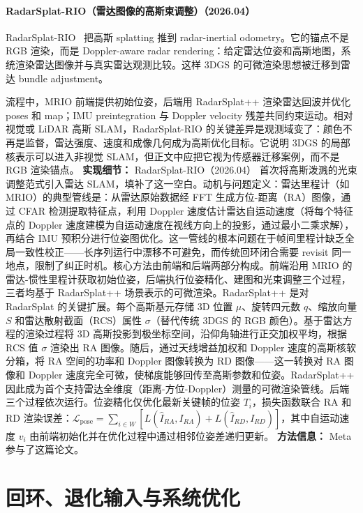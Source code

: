 \paragraph{RadarSplat-RIO（雷达图像的高斯束调整）（2026.04）}
RadarSplat-RIO~\cite{2604_13492} 把高斯 splatting 推到 radar-inertial odometry。它的锚点不是 RGB 渲染，而是 Doppler-aware radar rendering：给定雷达位姿和高斯地图，系统渲染雷达图像并与真实雷达观测比较。这样 3DGS 的可微渲染思想被迁移到雷达 bundle adjustment。

流程中，MRIO 前端提供初始位姿，后端用 RadarSplat++ 渲染雷达回波并优化 poses 和 map；IMU preintegration 与 Doppler velocity 残差共同约束运动。相对视觉或 LiDAR 高斯 SLAM，RadarSplat-RIO 的关键差异是观测域变了：颜色不再是监督，雷达强度、速度和成像几何成为高斯优化目标。它说明 3DGS 的局部核表示可以进入非视觉 SLAM，但正文中应把它视为传感器迁移案例，而不是 RGB 渲染锚点。
\textbf{实现细节：} RadarSplat-RIO（2026.04） 首次将高斯泼溅的光束调整范式引入雷达 SLAM，填补了这一空白。动机与问题定义：雷达里程计（如 MRIO）的典型管线是：从雷达原始数据经 FFT 生成方位-距离（RA）图像，通过 CFAR 检测提取特征点，利用 Doppler 速度估计雷达自运动速度（将每个特征点的 Doppler 速度建模为自运动速度在视线方向上的投影，通过最小二乘求解），再结合 IMU 预积分进行位姿图优化。这一管线的根本问题在于帧间里程计缺乏全局一致性校正——长序列运行中漂移不可避免，而传统回环闭合需要 revisit 同一地点，限制了纠正时机。核心方法由前端和后端两部分构成。前端沿用 MRIO 的雷达-惯性里程计获取初始位姿，后端执行位姿精化、建图和光束调整三个过程，三者均基于 RadarSplat++ 场景表示的可微渲染。RadarSplat++ 是对 RadarSplat 的关键扩展。每个高斯基元存储 3D 位置 $\mu$、旋转四元数 $q$、缩放向量 $S$ 和雷达散射截面（RCS）属性 $\sigma$（替代传统 3DGS 的 RGB 颜色）。基于雷达方程的渲染过程将 3D 高斯投影到极坐标空间，沿仰角轴进行正交加权平均，根据 RCS 值 $\sigma$ 渲染出 RA 图像。随后，通过天线增益加权和 Doppler 速度的高斯核软分箱，将 RA 空间的功率和 Doppler 图像转换为 RD 图像——这一转换对 RA 图像和 Doppler 速度完全可微，使梯度能够回传至高斯参数和位姿。RadarSplat++ 因此成为首个支持雷达全维度（距离-方位-Doppler）测量的可微渲染管线。后端三个过程依次运行。位姿精化仅优化最新关键帧的位姿 $T_i$，损失函数联合 RA 和 RD 渲染误差：$\mathcal{L}_{\mathrm{pose}} = \sum_{i \in W} \left[ L\!\left(\hat{I}_{RA}, I_{RA}\right) + L\!\left(\hat{I}_{RD}, I_{RD}\right) \right]$，其中自运动速度 $v_i$ 由前端初始化并在优化过程中通过相邻位姿差递归更新。
\textbf{方法信息：} Meta 参与了这篇论文。
\section{回环、退化输入与系统优化}

